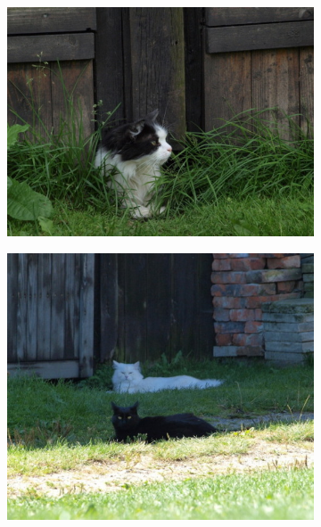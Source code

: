 \begin{figure}[H]
    \begin{subfigure}{0.32\textwidth}
      \centering
      \includegraphics[scale=1.0]{obrazky/cropFanglecian.jpg}
    \end{subfigure}
    \begin{subfigure}{.32\textwidth}
      \centering
      \includegraphics[scale=1.0]{obrazky/cropFangkocky.jpg}
    \end{subfigure}
    \begin{subfigure}{.32\textwidth}
      \centering

\end{subfigure}
\end{figure}
